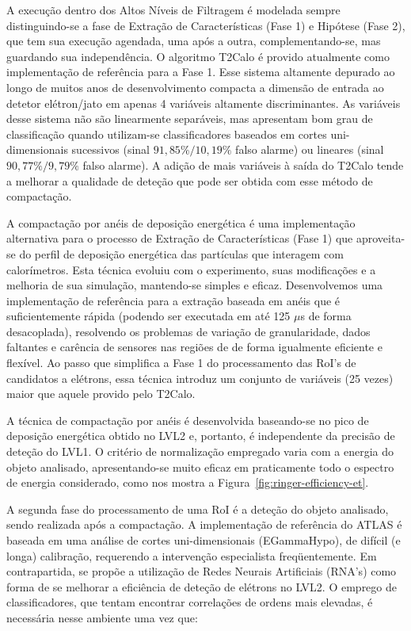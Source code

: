 A execução dentro dos Altos Níveis de Filtragem é modelada sempre
distinguindo-se a fase de Extração de Características (Fase 1) e Hipótese
(Fase 2), que tem sua execução agendada, uma após a outra, complementando-se,
mas guardando sua independência. O algoritmo T2Calo é provido atualmente como
implementação de referência para a Fase 1. Esse sistema altamente depurado ao
longo de muitos anos de desenvolvimento compacta a dimensão de entrada ao
detetor elétron/jato em apenas 4 variáveis altamente discriminantes. As
variáveis desse sistema não são linearmente separáveis, mas apresentam bom
grau de classificação quando utilizam-se classificadores baseados em cortes
uni-dimensionais sucessivos (sinal $91,85\%/10,19\%$ falso alarme) ou lineares
(sinal $90,77\%/9,79\%$ falso alarme). A adição de mais variáveis à saída do
T2Calo tende a melhorar a qualidade de deteção que pode ser obtida com esse
método de compactação.

A compactação por anéis de deposição energética é uma implementação
alternativa para o processo de Extração de Características (Fase 1) que
aproveita-se do perfil de deposição energética das partículas que interagem
com calorímetros. Esta técnica evoluiu com o experimento, suas modificações e
a melhoria de sua simulação, mantendo-se simples e eficaz. Desenvolvemos uma
implementação de referência para a extração baseada em anéis que é
suficientemente rápida (podendo ser executada em até 125 $\mu$s de forma
desacoplada), resolvendo os problemas de variação de granularidade, dados
faltantes e carência de sensores nas regiões de  de forma
igualmente eficiente e flexível. Ao passo que simplifica a Fase 1 do
processamento das RoI's de candidatos a elétrons, essa técnica introduz um
conjunto de variáveis (25 vezes) maior que aquele provido pelo T2Calo.

A técnica de compactação por anéis é desenvolvida baseando-se no pico de
deposição energética obtido no LVL2 e, portanto, é independente da precisão de
deteção do LVL1. O critério de normalização empregado varia com a energia do
objeto analisado, apresentando-se muito eficaz em praticamente todo o espectro
de energia considerado, como nos mostra a
Figura~\ref{fig:ringer-efficiency-et}.

A segunda fase do processamento de uma RoI é a deteção do objeto analisado,
sendo realizada após a compactação. A implementação de referência do ATLAS é
baseada em uma análise de cortes uni-dimensionais (EGammaHypo), de difícil (e
longa) calibração, requerendo a intervenção especialista freqüentemente. Em
contrapartida, se propõe a utilização de Redes Neurais Artificiais (RNA's)
como forma de se melhorar a eficiência de deteção de elétrons no LVL2. O
emprego de classificadores, que tentam encontrar correlações de ordens mais
elevadas, é necessária nesse ambiente uma vez que:

